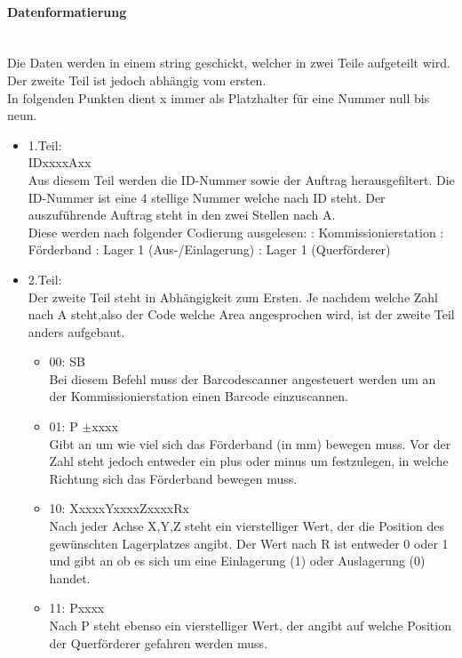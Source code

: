         \paragraph{Datenformatierung}\mbox{}\\
        Die Daten werden in einem string geschickt, welcher in zwei Teile aufgeteilt wird. Der zweite Teil ist jedoch abhängig vom ersten. \\
        In folgenden Punkten dient x immer als Platzhalter für eine Nummer null bis neun. 
        \begin{itemize}
            \item 1.Teil: \\
            IDxxxxAxx  \\
            Aus diesem Teil werden die ID-Nummer sowie der Auftrag herausgefiltert. Die ID-Nummer ist eine 4 stellige Nummer welche nach ID steht. Der auszuführende Auftrag steht in den zwei Stellen nach A.\\
            Diese werden nach folgender Codierung ausgelesen:
                : Kommissionierstation
                : Förderband
                : Lager 1 (Aus-/Einlagerung)
                : Lager 1 (Querförderer)
            \item 2.Teil: \\
            Der zweite Teil steht in Abhängigkeit zum Ersten. Je nachdem welche Zahl nach A steht,also der Code welche Area angesprochen wird, ist der zweite Teil anders aufgebaut.
                \begin{itemize}
                \item 00: SB\\
                Bei diesem Befehl muss der Barcodescanner angesteuert werden um an der Kommissionierstation einen Barcode einzuscannen.
                \item 01: P $\pm$xxxx \\
                Gibt an um wie viel sich das Förderband (in mm) bewegen muss. Vor der Zahl steht jedoch entweder ein plus oder minus um festzulegen, in welche Richtung sich das Förderband bewegen muss. 
                \item 10: XxxxxYxxxxZxxxxRx \\
                Nach jeder Achse X,Y,Z steht ein vierstelliger Wert, der die Position des gewünschten Lagerplatzes angibt. Der Wert nach R ist entweder 0 oder 1 und gibt an ob es sich um eine Einlagerung (1) oder Auslagerung (0) handet.
                \item 11: Pxxxx \\
                Nach P steht ebenso ein vierstelliger Wert, der angibt auf welche Position der Querförderer gefahren werden muss. 
                
                \end{itemize}
            
        \end{itemize}

